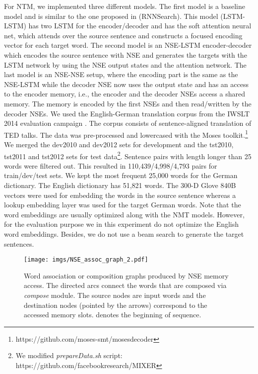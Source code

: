 \documentclass{article}
\begin{document}
For NTM, we implemented three different models. The first model is a baseline model and is similar to the one proposed in \cite{bahdanau:15} (RNNSearch). This model (LSTM-LSTM) has two LSTM for the encoder/decoder and has the soft attention neural net, which attends over the source sentence and constructs a focused encoding vector for each target word. The second model is an NSE-LSTM encoder-decoder which encodes the source sentence with NSE and generates the targets with the LSTM network by using the NSE output states and the attention network. The last model is an NSE-NSE setup, where the encoding part is the same as the NSE-LSTM while the decoder NSE now uses the output state and has an access to the encoder memory, i.e., the encoder and the decoder NSEs access a shared memory. The memory is encoded by the first NSEs and then read/written by the decoder NSEs. 
We used the English-German translation corpus from the IWSLT 2014 evaluation campaign \cite{cettoloEtAl:EAMT2012}. The corpus consists of sentence-aligned translation of TED talks. The data was pre-processed and lowercased with the Moses toolkit.\footnote{https://github.com/moses-smt/mosesdecoder} We merged the dev2010 and dev2012 sets for development and the tst2010, tst2011 and tst2012 sets for test data\footnote{We modified \textit{prepareData.sh} script: https://github.com/facebookresearch/MIXER}. Sentence pairs with length longer than 25 words were filtered out. This resulted in 110,439/4,998/4,793 pairs for train/dev/test sets. We kept the most frequent 25,000 words for the German dictionary. The English dictionary has 51,821 words. The 300-D Glove 840B vectors were used for embedding the words in the source sentence whereas a lookup embedding layer was used for the target German words. Note that the word embeddings are usually optimized along with the NMT models. However, for the evaluation purpose we in this experiment do not optimize the English word embeddings. Besides, we do not use a beam search to generate the target sentences.

\begin{figure*}[tp]
    \centering \texttt{[image: imgs/NSE\_assoc\_graph\_2.pdf]}
       \vspace*{-1.0cm}  
        \caption{\label{fig:asoc}
        Word association or composition graphs produced by NSE memory access. The directed arcs connect the words that are composed via \textit{compose} module. The source nodes are input words and the destination nodes (pointed by the arrows) correspond to the accessed memory slots.   denotes the beginning of sequence.}
\end{figure*}
\end{document}
